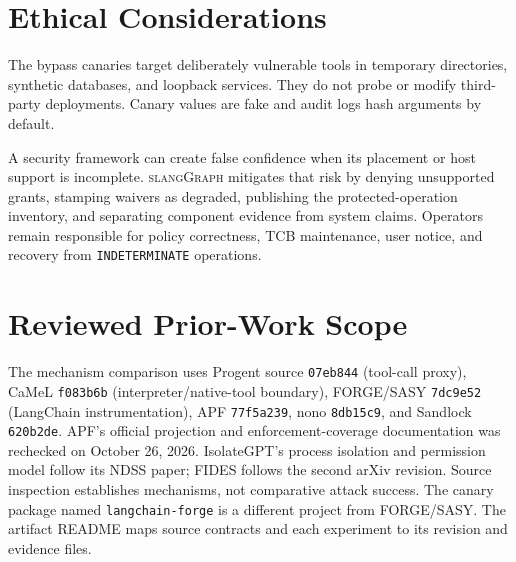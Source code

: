\documentclass[letterpaper,twocolumn,10pt]{article}
\newcommand{\sys}{\textsc{slangGraph}\xspace}
\newcommand{\code}[1]{\texttt{#1}}
\begin{document}
\section{Ethical Considerations}

The bypass canaries target deliberately vulnerable tools in temporary
directories, synthetic databases, and loopback services. They do not probe or
modify third-party deployments. Canary values are fake and audit logs hash
arguments by default.

A security framework can create false confidence when its placement or host
support is incomplete. \sys mitigates that risk by denying unsupported grants,
stamping waivers as degraded, publishing the protected-operation inventory, and
separating component evidence from system claims. Operators remain responsible
for policy correctness, TCB maintenance, user notice, and recovery from
\code{INDETERMINATE} operations.







\section{Reviewed Prior-Work Scope}
\label{app:prior-scope}

The mechanism comparison uses Progent source \code{07eb844}
(tool-call proxy), CaMeL \code{f083b6b} (interpreter/native-tool boundary),
FORGE/SASY \code{7dc9e52} (LangChain instrumentation), APF \code{77f5a239},
nono \code{8db15c9}, and Sandlock \code{620b2de}. APF's official projection and
enforcement-coverage documentation was rechecked on October 26, 2026.
IsolateGPT's process isolation
and permission model follow its NDSS paper; FIDES follows the second arXiv
revision. Source inspection establishes mechanisms, not comparative attack
success. The canary package named \code{langchain-forge} is a different project
from FORGE/SASY. The artifact README maps source contracts and each experiment
to its revision and evidence files.
\end{document}
